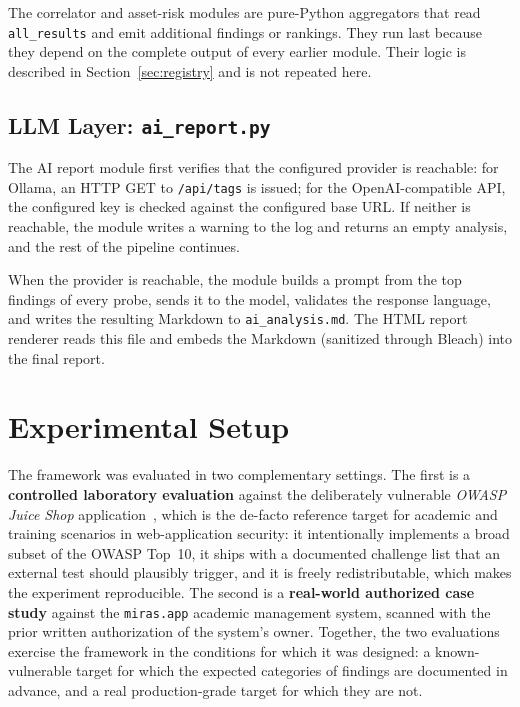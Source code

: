The correlator and asset-risk modules are pure-Python aggregators that read \texttt{all\_results} and emit additional findings or rankings. They run last because they depend on the complete output of every earlier module. Their logic is described in Section~\ref{sec:registry} and is not repeated here.

\subsection{LLM Layer: \texttt{ai\_report.py}}

The AI report module first verifies that the configured provider is reachable: for Ollama, an HTTP GET to \texttt{/api/tags} is issued; for the OpenAI-compatible API, the configured key is checked against the configured base URL. If neither is reachable, the module writes a warning to the log and returns an empty analysis, and the rest of the pipeline continues.

When the provider is reachable, the module builds a prompt from the top findings of every probe, sends it to the model, validates the response language, and writes the resulting Markdown to \texttt{ai\_analysis.md}. The HTML report renderer reads this file and embeds the Markdown (sanitized through Bleach) into the final report.

\section{Experimental Setup}

The framework was evaluated in two complementary settings. The first is a \textbf{controlled laboratory evaluation} against the deliberately vulnerable \textit{OWASP Juice Shop} application~\cite{juice_shop}, which is the de-facto reference target for academic and training scenarios in web-application security: it intentionally implements a broad subset of the OWASP Top~10, it ships with a documented challenge list that an external test should plausibly trigger, and it is freely redistributable, which makes the experiment reproducible. The second is a \textbf{real-world authorized case study} against the \texttt{miras.app} academic management system, scanned with the prior written authorization of the system's owner. Together, the two evaluations exercise the framework in the conditions for which it was designed: a known-vulnerable target for which the expected categories of findings are documented in advance, and a real production-grade target for which they are not.

